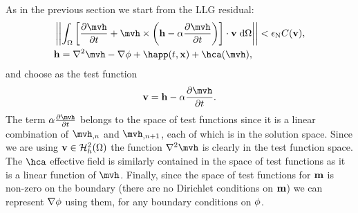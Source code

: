 As in the previous section we start from the LLG residual:
\begin{equation}
  \begin{aligned}
    &\norm{\intd{ \bigs{\dmdth + \mvh \times \bigb{\hv - \dampc \dmdth}} \cdot \testv}} < \ntol \sumbasiscoeff(\testv), \\
      &\hv = \lap \mvh - \nabla \phim + \happ(t, \xv) + \hca(\mvh),
    \end{aligned}
  \label{eq:85}
\end{equation}
and choose as the test function
\begin{equation}
  \testv = \hv - \dampc \dmdth.
  \label{eq:84}
\end{equation}
The term $\dampc \dmdth$ belongs to the space of test functions since it is a linear combination of $\mvh_{,n}$ and $\mvh_{,n+1}$, each of which is in the solution space.
Since we are using $\boldsymbol{\mathrm{v}} \in \mathcal{H}_h^2(\Omega)$ the function $\lap \mvh$ is clearly in the test function space.
The $\hca$ effective field is similarly contained in the space of test functions as it is a linear function of $\mvh$.
Finally, since the space of test functions for $\boldsymbol{\mathrm{m}}$ is non-zero on the boundary (\ie there are no Dirichlet conditions on $\boldsymbol{\mathrm{m}}$) we can represent $\nabla \phi$ using them, for any boundary conditions on $\phi$.

